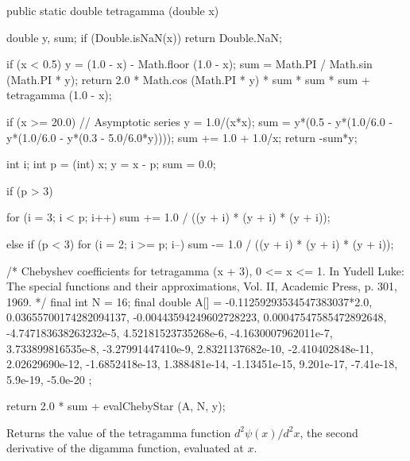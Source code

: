 \begin{code}

   public static double tetragamma (double x)\begin{hide} {
      double y, sum;
      if (Double.isNaN(x))
         return Double.NaN;

      if (x < 0.5) {
         y = (1.0 - x) - Math.floor (1.0 - x);
         sum = Math.PI / Math.sin (Math.PI * y);
         return 2.0 * Math.cos (Math.PI * y) * sum * sum * sum +
               tetragamma (1.0 - x);
      }

      if (x >= 20.0) {
         // Asymptotic series
         y = 1.0/(x*x);
         sum = y*(0.5 - y*(1.0/6.0 - y*(1.0/6.0 - y*(0.3 - 5.0/6.0*y))));
         sum += 1.0 + 1.0/x;
         return -sum*y;
      }

      int i;
      int p = (int) x;
      y = x - p;
      sum = 0.0;

      if (p > 3) {
         for (i = 3; i < p; i++)
            sum += 1.0 / ((y + i) * (y + i) * (y + i));

      } else if (p < 3) {
         for (i = 2; i >= p; i--)
            sum -= 1.0 / ((y + i) * (y + i) * (y + i));
      }

      /* Chebyshev coefficients for tetragamma (x + 3), 0 <= x <= 1. In Yudell
         Luke: The special functions and their approximations, Vol. II,
         Academic Press, p. 301, 1969. */
      final int N = 16;
      final double A[] = { -0.11259293534547383037*2.0, 0.03655700174282094137,
         -0.00443594249602728223, 0.00047547585472892648,
         -4.747183638263232e-5, 4.52181523735268e-6, -4.1630007962011e-7,
         3.733899816535e-8, -3.27991447410e-9, 2.8321137682e-10,
         -2.410402848e-11, 2.02629690e-12, -1.6852418e-13, 1.388481e-14,
         -1.13451e-15, 9.201e-17, -7.41e-18, 5.9e-19, -5.0e-20 };

      return 2.0 * sum + evalChebyStar (A, N, y);
   }\end{hide}
\end{code}
\begin{tabb}
   Returns the value of the tetragamma function $d^{2}\psi(x)/d^{2}x$, the second
   derivative of the digamma function, evaluated at $x$.
\end{tabb}
